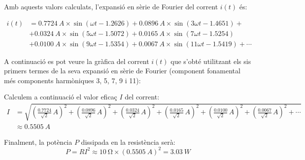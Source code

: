\begin{exemple}
    Amb aquests valors calculats, l'expansió en sèrie de Fourier del
    corrent $i(t)$ és:
    
    \[\begin{split}
         i(t) &=  \qty{0,7724}{A} \times \sin(\omega t - \num{1,2626}) +  \qty{0,0896}{A} \times \sin(3 \omega t -
         \num{1,4651}) + \\
         &+ \qty{0,0324}{A} \times \sin(5 \omega t - \num{1,5072}) +
          \qty{0,0165}{A} \times \sin(7 \omega t - \num{1,5254}) \\
          &+ \qty{0,0100}{A} \times \sin(9 \omega t - \num{1,5354})
         + \qty{0,0067}{A} \times \sin(11 \omega t - \num{1,5419}) +\cdots
    \end{split}\]

    A continuació es pot veure la gràfica del corrent $i(t)$ que
    s'obté utilitzant els sis primers termes de la seva expansió en
    sèrie de Fourier (component fonamental més components harmòniques 3, 5, 7, 9 i 11):

    \begin{center}
      
    \end{center}

    Calculem a continuació el valor eficaç $I$ del corrent:
    \[\begin{split}
        I &= \sqrt{\left(\tfrac{\num{0,7724}}{\sqrt{2}}\unit{\,A}\right)^2 +
            \left(\tfrac{\num{0,0896}}{\sqrt{2}}\unit{\,A}\right)^2 +
            \left(\tfrac{\num{0,0324}}{\sqrt{2}}\unit{\,A}\right)^2 +
            \left(\tfrac{\num{0,0165}}{\sqrt{2}}\unit{\,A}\right)^2 +
            \left(\tfrac{\num{0,0100}}{\sqrt{2}}\unit{\,A}\right)^2 +
            \left(\tfrac{\num{0,0067}}{\sqrt{2}}\unit{\,A}\right)^2 + \cdots}
             \\[1ex]
            &\approx \qty{0,5505}{A}
    \end{split}\]

    Finalment, la potència $P$ dissipada en la resistència serà:
    \[
        P = R I^2 \approx \qty{10}{\ohm} \times (\qty{0,5505}{A})^2 =
        \qty{3,03}{W}
    \]


\end{exemple}
